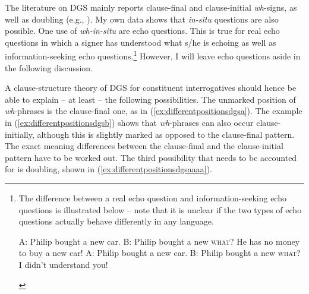 The literature on DGS mainly reports clause-final and clause-initial \textit{wh}-signs, as well as doubling (e.g., \citealt{papaspyrou2008grammatik, happ2014vork}). My own data shows that \textit{in-situ} questions are also possible. One use of \textit{wh-in-situ} are echo questions. This is true for real echo questions in which a signer has understood what s/he is echoing as well as information-seeking echo questions.\footnote{The difference between a real echo question and information-seeking echo questions is illustrated below -- note that it is unclear if the two types of echo questions actually behave differently in any language.

\begin{exe}
\ex\label{echoquestionillustrationenglish}\begin{xlist}
\ex A: Philip bought a new car.
\glt B: Philip bought a new \textsc{what}? He has no money to buy a new car! \label{echoquestionillustrationenglishb}
\ex A: Philip bought a new car.
\glt B: Philip bought a new \textsc{what}? I didn't understand you! \label{echoquestionillustrationenglisha}

\end{xlist}
\end{exe}

} However, I will leave echo questions aside in the following discussion.

A clause-structure theory of DGS %
for constituent interrogatives should hence be able to explain -- at least -- the following possibilities. The unmarked position of \textit{wh}-phrases is the clause-final one, as in (\ref{ex:differentpositionsdgsa}). The example in (\ref{ex:differentpositionsdgsb}) shows that \textit{wh}-phrases can also occur clause-initially, although this is slightly marked as opposed to the clause-final pattern. The exact meaning differences between the clause-final and the clause-initial pattern have to be worked out. The third possibility that needs to be accounted for is doubling, shown in (\ref{ex:differentpositionsdgsaaaa}). 


